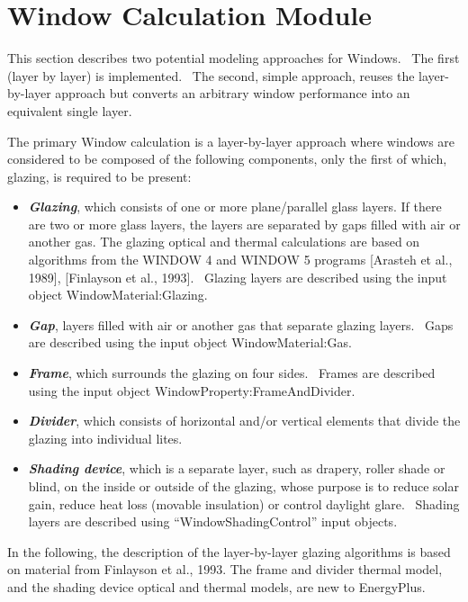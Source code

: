 \section{Window Calculation Module}\label{window-calculation-module}

This section describes two potential modeling approaches for Windows.~ The first (layer by layer) is implemented.~ The second, simple approach, reuses the layer-by-layer approach but converts an arbitrary window performance into an equivalent single layer.

The primary Window calculation is a layer-by-layer approach where windows are considered to be composed of the following components, only the first of which, glazing, is required to be present:

\begin{itemize}
\item
  \textbf{\emph{Glazing}}, which consists of one or more plane/parallel glass layers. If there are two or more glass layers, the layers are separated by gaps filled with air or another gas. The glazing optical and thermal calculations are based on algorithms from the WINDOW 4 and WINDOW 5 programs {[}Arasteh et al., 1989{]}, {[}Finlayson et al., 1993{]}.~ Glazing layers are described using the input object WindowMaterial:Glazing.
\item
  \textbf{\emph{Gap}}, layers filled with air or another gas that separate glazing layers.~ Gaps are described using the input object WindowMaterial:Gas.
\item
  \textbf{\emph{Frame}}, which surrounds the glazing on four sides.~ Frames are described using the input object WindowProperty:FrameAndDivider.
\item
  \textbf{\emph{Divider}}, which consists of horizontal and/or vertical elements that divide the glazing into individual lites.
\item
  \textbf{\emph{Shading device}}, which is a separate layer, such as drapery, roller shade or blind, on the inside or outside of the glazing, whose purpose is to reduce solar gain, reduce heat loss (movable insulation) or control daylight glare.~ Shading layers are described using ``WindowShadingControl'' input objects.
\end{itemize}

In the following, the description of the layer-by-layer glazing algorithms is based on material from Finlayson et al., 1993. The frame and divider thermal model, and the shading device optical and thermal models, are new to EnergyPlus.

